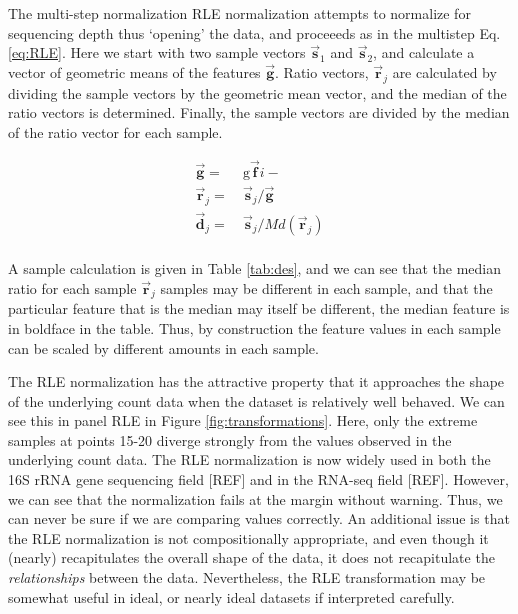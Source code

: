 \documentclass[onecolumn]{article}
\newcommand{\vect}[1]{\vec{\textbf{#1}}}
\begin{document}
The multi-step normalization RLE normalization attempts to normalize for sequencing depth thus `opening' the data, and proceeeds as in the multistep Eq. \ref{eq:RLE}. Here we start with two sample vectors \(\vec{\textbf{s}}_1\) and \(\vec{\textbf{s}}_2\), and calculate a vector of geometric means of the features \(\vec{\textbf{g}}\). Ratio vectors, \(\vec{\textbf{r}}_j\) are calculated by dividing the sample vectors by the geometric mean vector, and the median of the ratio vectors is determined. Finally, the sample vectors are divided by the median of the ratio vector for each sample.

\begin{equation}
    \begin{aligned}
        \vec{\textbf{g}} = &\ \mathrm{g}\vect{f}{i-}\\
        \vec{\textbf{r}}_j = &\ \vec{\textbf{s}}_j / \vec{\textbf{g}}\\
        \vec{\textbf{d}}_j = &\ \vec{\textbf{s}}_j / Md(\vec{\textbf{r}}_j)\\
    \end{aligned}
\label{eq:RLE}
\end{equation}

A sample calculation is given in Table \ref{tab:des}, and we can see that the median ratio for each sample \(\vec{\textbf{r}}_j\) samples may be different in each sample, and that the particular feature that is the median may itself be different, the median feature is in boldface in the table. Thus, by construction the feature values in each sample can be scaled by different amounts in each sample.

The RLE normalization has the attractive property that it approaches the shape of the underlying count data when the dataset is relatively well behaved. We can see this in panel RLE in Figure \ref{fig:transformations}. Here, only the extreme samples at points 15-20 diverge strongly from the values observed in the underlying count data. The RLE normalization is now widely used in both the 16S rRNA gene sequencing field {[}REF{]} and in the RNA-seq field {[}REF{]}. However, we can see that the normalization fails at the margin without warning. Thus, we can never be sure if we are comparing values correctly. An additional issue is that the RLE normalization is not compositionally appropriate, and even though it (nearly) recapitulates the overall shape of the data, it does not recapitulate the \emph{relationships} between the data. Nevertheless, the RLE transformation may be somewhat useful in ideal, or nearly ideal datasets if interpreted carefully.
\end{document}
